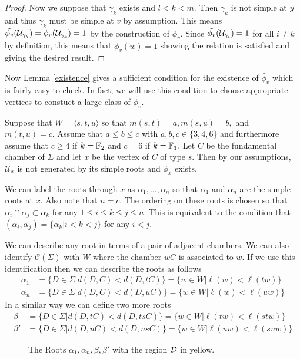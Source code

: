 \documentclass[class=book, crop=false,12 pt]{standalone}
\begin{document}
\begin{proof}
	Now we suppose that $\gamma_k$ exists and $l<k<m.$ Then $\gamma_k$ is not simple at $y$ and thus $\gamma_k$ must be simple at $v$ by assumption. This means $\tilde{\phi_v}(\mathcal{U}_{\gamma_k})=\phi_v(\mathcal{U}_{\gamma_k})=1$ by the construction of $\phi_v.$ Since $\tilde{\phi_v}(\mathcal{U}_{\gamma_i})=1$ for all $i\neq k$ by definition, this means that $\tilde{\phi_v}(w)=1$ showing the relation is satisfied and giving the desired result.
\end{proof}

Now Lemma \ref{existence} gives a sufficient condition for the existence of $\tilde{\phi_v}$ which is fairly easy to check. In fact, we will use this condition to choose appropriate vertices to constuct a large class of $\tilde{\phi_v}.$

Suppose that $W=\langle s,t,u \rangle$ so that $m(s,t)=a,m(s,u)=b,$ and $m(t,u)=c.$ Assume that $a\le b\le c$ with $a,b,c\in \{3,4,6\}$ and furthermore assume that $c\ge 4$ if $k=\mathbb{F}_{2}$ and $c=6$ if $k=\mathbb{F}_{3}.$ Let $C$ be the fundamental chamber of $\Sigma$ and let $x$ be the vertex of $C$ of type $s.$ Then by our assumptions, $\mathcal{U}_x$ is not generated by its simple roots and $\phi_x$ exists.

We can label the roots through $x$ as $\alpha_1,\dots,\alpha_n$ so that $\alpha_1$ and $\alpha_n$ are the simple roots at $x.$ Also note that $n=c.$ The ordering on these roots is chosen so that $\alpha_i\cap \alpha_j\subset \alpha_k$ for any $1\le i \le k \le j\le n.$ This is equivalent to the condition that $(\alpha_i,\alpha_j)=\{\alpha_k|i<k<j\}$ for any $i<j.$

We can describe any root in terms of a pair of adjacent chambers. We can also identify $\mathcal{C}(\Sigma)$ with $W$ where the chamber $wC$ is associated to $w.$ If we use this identification then we can describe the roots as follows
\begin{align*}
	\alpha_1&=\{D\in \Sigma|d(D,C)<d(D,tC)\}=\{w\in W|\ell(w)<\ell(tw)\}\\
	\alpha_n&=\{D\in \Sigma|d(D,C)<d(D,uC)\}=\{w\in W|\ell(w)<\ell(uw)\}
\end{align*}
In a similar way we can define two more roots
\begin{align*}
	\beta&=\{D\in \Sigma|d(D,tC)<d(D,tsC)\}=\{w\in W|\ell(tw)<\ell(stw)\}\\
	\beta'&=\{D\in \Sigma|d(D,uC)<d(D,usC)\}=\{w\in W|\ell(uw)<\ell(suw)\}
\end{align*}
\begin{figure}[h]
	\label{defineD}
	\begin{center}
	\caption{The Roots $\alpha_1,\alpha_n,\beta,\beta'$ with the region $\mathcal{D}$ in yellow.}
\end{center}
\end{figure}
\end{document}
